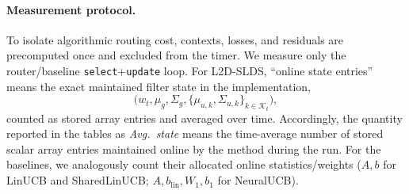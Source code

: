 \paragraph{Measurement protocol.}
To isolate algorithmic routing cost, contexts, losses, and residuals are precomputed once and excluded from the timer. We measure only the router/baseline \texttt{select}+\texttt{update} loop. For L2D-SLDS, ``online state entries'' means the exact maintained filter state in the implementation,
\begin{equation}
\bigl(w_t,\mu_g,\Sigma_g,\{\mu_{u,k},\Sigma_{u,k}\}_{k\in\mathcal K_t}\bigr),
\end{equation}
counted as stored array entries and averaged over time. Accordingly, the quantity reported in the tables as \emph{Avg.\ state} means the time-average number of stored scalar array entries maintained online by the method during the run. For the baselines, we analogously count their allocated online statistics/weights (\(A,b\) for LinUCB and SharedLinUCB; \(A,b_{\mathrm{lin}},W_1,b_1\) for NeuralUCB).

\begin{table}[t]
\caption{Bounded active set, growing catalog on the paper synthetic. The active set is always four experts, while the cumulative catalog grows to \(R\). Here ``Avg.\ state'' denotes the time-average number of stored scalar entries in the maintained online state. L2D-SLDS keeps a small maintained registry and modest maintained online state size; the shared-parameter linear baseline must allocate a rapidly growing joint model.}
\label{tab:complexity_registry_scaling}
\centering
\scriptsize
{}
\end{table}

